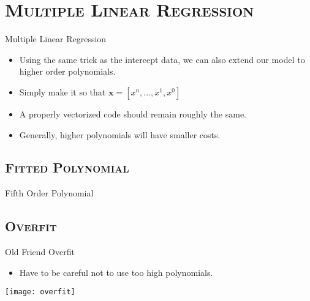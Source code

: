 \section{\scshape Multiple Linear Regression}
\begin{frame}{Multiple Linear Regression}
	\begin{itemize}
		\item Using the same trick as the intercept data, we can also extend our model to higher order polynomials.
		\item Simply make it so that $\boldsymbol{x} = [x^n, ..., x^1, x^0]$
		\item A properly vectorized code should remain roughly the same.
		\item Generally, higher polynomials will have smaller costs.
	\end{itemize}
\end{frame}

\subsection{\scshape Fitted Polynomial}
\begin{frame}{Fifth Order Polynomial}
	\begin{center}
	\end{center}
\end{frame}

\subsection{\scshape Overfit}
\begin{frame}{Old Friend Overfit}
	\begin{itemize}
		\item Have to be careful not to use too high polynomials.
	\end{itemize}
	\begin{center}
		\texttt{[image: overfit]}
	\end{center}
\end{frame}

